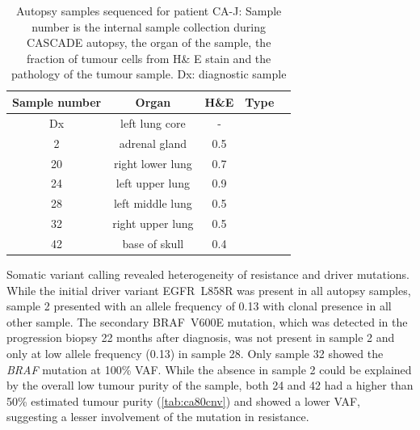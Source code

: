 \begin{table}[ht]
\caption[Autopsy samples sequenced for patient CA-J]{Autopsy samples sequenced for patient CA-J: Sample number is the internal sample collection during CASCADE autopsy, the organ of the sample, the fraction of tumour cells from H\& E stain and the pathology of the tumour sample. Dx: diagnostic sample}\label{tab:ca80wgsSamples}
\centering
{}
\begin{tabular}{|c|c|c|c|c|}
\toprule
\hline
 \rowcolor{gray!50}
\textbf{Sample number} & \textbf{Organ} & \textbf{H\&E} & \textbf{Type}\\
\hline
 Dx & left lung core & - & \cellcolor{white} \\
 2 & adrenal gland & 0.5 & \cellcolor{white} \\
 20 & right lower lung & 0.7 & \cellcolor{white} \\
 24 & left upper lung & 0.9 & \cellcolor{white} \\
 28 & left middle lung & 0.5 & \cellcolor{white} \\
 32 & right upper lung & 0.5 & \cellcolor{white} \\
 42 & base of skull & 0.4 & \cellcolor{white}\multirow{-7}{*}{adenocarcinoma} \\
 \hline
\bottomrule
\end{tabular}
\end{table} 

Somatic variant calling revealed heterogeneity of resistance and driver mutations. While the initial driver variant EGFR~L858R was present in all autopsy samples, sample 2 presented with an allele frequency of 0.13 with clonal presence in all other sample. The secondary BRAF~V600E mutation, which was detected in the progression biopsy 22 months after diagnosis, was not present in sample 2 and only at  low allele frequency (0.13) in sample 28. Only sample 32 showed the \textit{BRAF} mutation at 100\% VAF. While the absence in sample 2 could be explained by the overall low tumour purity of the sample, both 24 and 42 had a higher than 50\% estimated tumour purity (\autoref{tab:ca80cnv}) and showed a lower VAF,  suggesting a lesser involvement of the mutation in resistance.

